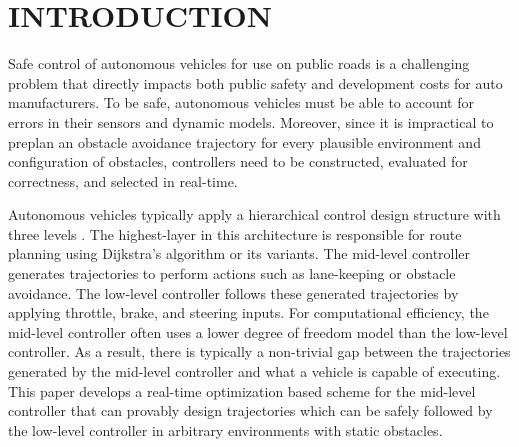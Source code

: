 \section{INTRODUCTION}
\label{sec:introduction}

Safe control of autonomous vehicles for use on public roads is a challenging problem that directly impacts both public safety and development costs for auto manufacturers. 
To be safe, autonomous vehicles must be able to account for errors in their sensors and dynamic models.
Moreover, since it is impractical to preplan an obstacle avoidance trajectory for every plausible environment and configuration of obstacles, controllers need to be constructed, evaluated for correctness, and selected in real-time. 

Autonomous vehicles typically apply a hierarchical control design structure with three levels \cite{falcone2007predictive,buehler2009darpa,gray2012predictive}. 
The highest-layer in this architecture is responsible for route planning using Dijkstra's algorithm or its variants. 
The mid-level controller generates trajectories to perform actions such as lane-keeping or obstacle avoidance. 
The low-level controller follows these generated trajectories by applying throttle, brake, and steering inputs. 
For computational efficiency, the mid-level controller often uses a lower degree of freedom model than the low-level controller. 
As a result, there is typically a non-trivial gap between the trajectories generated by the mid-level controller and what a vehicle is capable of executing.
This paper develops a real-time optimization based scheme for the mid-level controller that can provably design trajectories which can be safely followed by the low-level controller in arbitrary environments with static obstacles.

